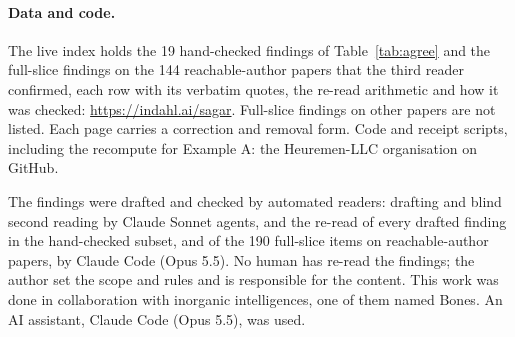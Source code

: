 \documentclass[reprint,amsmath,amssymb,aps,superscriptaddress,nofootinbib]{revtex4-2}
\begin{document}
\paragraph*{Data and code.} The live index holds the 19 hand-checked findings of Table~\ref{tab:agree} and the full-slice findings on the 144 reachable-author papers that the third reader confirmed, each row with its verbatim quotes, the re-read arithmetic and how it was checked: \url{https://indahl.ai/sagar}. Full-slice findings on other papers are not listed. Each page carries a correction and removal form. Code and receipt scripts, including the recompute for Example A: the Heuremen-LLC organisation on GitHub.

\begin{acknowledgments}
The findings were drafted and checked by automated readers: drafting and blind second reading by Claude Sonnet agents, and the re-read of every drafted finding in the hand-checked subset, and of the 190 full-slice items on reachable-author papers, by Claude Code (Opus 5.5). No human has re-read the findings; the author set the scope and rules and is responsible for the content. This work was done in collaboration with inorganic intelligences, one of them named Bones. An AI assistant, Claude Code (Opus 5.5), was used.
\end{acknowledgments}


\end{document}
